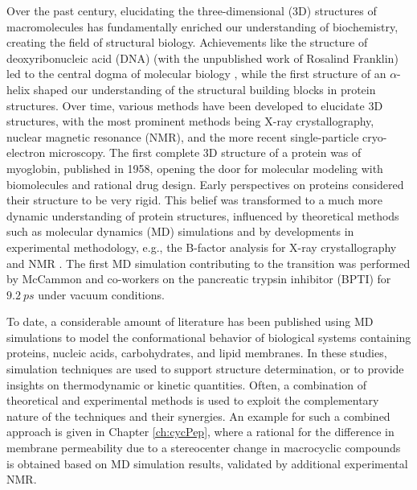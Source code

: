 Over the past century, elucidating the three-dimensional (3D) structures of macromolecules has fundamentally enriched our understanding of biochemistry,\cite{Wagner1997, Shi2014} creating the field of structural biology. Achievements like the structure of deoxyribonucleic acid (DNA)\cite{Watson1953} (with the unpublished work of Rosalind Franklin\cite{Elkin2003}) led to the central dogma of molecular biology \cite{Crick1970}, while the first structure of an $\alpha$-helix \cite{Pauling1951} shaped our understanding of the structural building blocks in protein structures. Over time, various methods have been developed to elucidate 3D structures, with the most prominent methods being X-ray crystallography\cite{Ladd1977, Shi2014}, nuclear magnetic resonance (NMR),\cite{Wagner1997,  Shi2014, Jacobsen2007, Markwick2008} and the more recent single-particle cryo-electron microscopy\cite{Doerr2016, Agard2014, Cheng2017, Kuhlbrandt2014}. The first complete 3D structure of a protein was of myoglobin\cite{Kendrew1958}, published in 1958, opening the door for molecular modeling with biomolecules and rational drug design.
Early perspectives on proteins considered their structure to be very rigid.  \cite{Karplus2002} This belief was transformed to a much more dynamic understanding of protein structures, influenced by theoretical methods such as molecular dynamics (MD) simulations \cite{Karplus2002, Phillips1981} and by developments in experimental methodology, e.g., the B-factor analysis for X-ray crystallography\cite{Frauenfelder1979} and NMR \cite{Wuthrich1975, Torchia1984, Dobson1986}. The first MD simulation contributing to the transition was performed by McCammon and co-workers on the pancreatic trypsin inhibitor (BPTI) for $9.2~ps$ under vacuum conditions. \cite{Mccammon1977} 

To date, a considerable amount of literature has been published using MD simulations to model the conformational behavior of biological systems containing proteins, nucleic acids, carbohydrates, and lipid membranes. \cite{Leach2001, Karplus2002, Chavent2014, Hollingsworth2018} In these studies, simulation techniques are used to support structure determination, or to provide insights on thermodynamic or kinetic quantities. \cite{Gunsteren1990, Karplus2002} 
Often, a combination of theoretical and experimental methods is used to exploit the complementary nature of the techniques and their synergies. \cite{Gunsteren2008} An example for such a combined approach is given in Chapter \ref{ch:cycPep}, where a rational for the difference in membrane permeability due to a stereocenter change in macrocyclic compounds   is obtained based on MD simulation results,  validated by additional experimental NMR.

